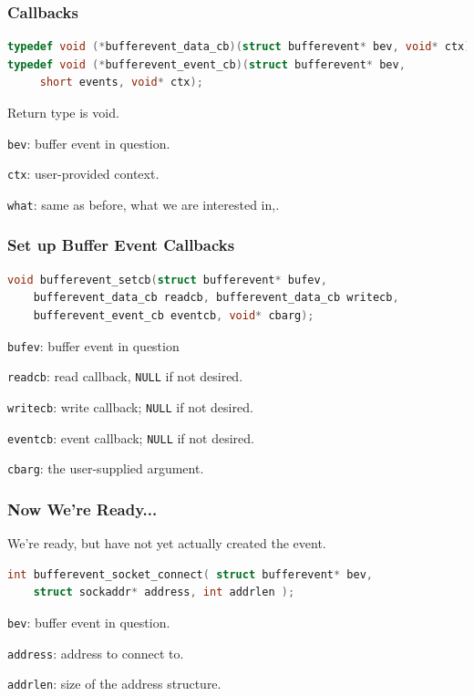 \begin{frame}[fragile]
\frametitle{Callbacks}

\begin{lstlisting}[language=C]
typedef void (*bufferevent_data_cb)(struct bufferevent* bev, void* ctx);
typedef void (*bufferevent_event_cb)(struct bufferevent* bev, 
     short events, void* ctx);
\end{lstlisting}

Return type is void.

\texttt{bev}: buffer event in question.

\texttt{ctx}: user-provided context.

\texttt{what}: same as before, what we are interested in,.

\end{frame}


\begin{frame}[fragile]
\frametitle{Set up Buffer Event Callbacks}

\begin{lstlisting}[language=C]
void bufferevent_setcb(struct bufferevent* bufev, 
    bufferevent_data_cb readcb, bufferevent_data_cb writecb, 
    bufferevent_event_cb eventcb, void* cbarg);
\end{lstlisting}

\texttt{bufev}: buffer event in question

\texttt{readcb}: read callback, \texttt{NULL} if not desired.

\texttt{writecb}: write callback; \texttt{NULL} if not desired.

\texttt{eventcb}: event callback; \texttt{NULL} if not desired.

\texttt{cbarg}: the user-supplied argument.

\end{frame}


\begin{frame}[fragile]
\frametitle{Now We're Ready...}

We're ready, but have not yet actually created the event.

\begin{lstlisting}[language=C]
int bufferevent_socket_connect( struct bufferevent* bev, 
    struct sockaddr* address, int addrlen );
\end{lstlisting}

\texttt{bev}: buffer event in question.

\texttt{address}: address to connect to.

\texttt{addrlen}: size of the address structure.

\end{frame}


